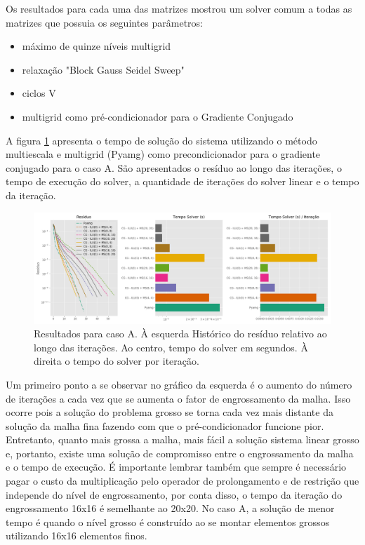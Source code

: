 Os resultados para cada uma das matrizes mostrou um solver comum a todas as matrizes que possuia os seguintes parâmetros:

\begin{itemize}
    \item máximo de quinze níveis multigrid
    \item relaxação "Block Gauss Seidel Sweep" 
    \item ciclos V
    \item multigrid como pré-condicionador para o Gradiente Conjugado
\end{itemize}

A figura \ref{fig:reservatorio100x100_1} apresenta o tempo de solução do sistema utilizando o método multiescala e multigrid (Pyamg) como precondicionador para o gradiente conjugado para o caso A. São apresentados o resíduo ao longo das iterações, o tempo de execução do solver, a quantidade de iterações do solver linear e o tempo da iteração.

\begin{figure}[!htbp]
\caption{Resultados para caso A. À esquerda Histórico do resíduo relativo ao longo das iterações. 
Ao centro, tempo do solver em segundos. À direita o tempo do solver por iteração. }
\label{fig:reservatorio100x100_1}
\centering
\includegraphics[width=\textwidth]{chap08/figs/reservatorio100x100_1.png}
\end{figure}

Um primeiro ponto a se observar no gráfico da esquerda é o aumento do número de iterações a cada vez que se aumenta o fator de engrossamento da malha. 
Isso ocorre pois a solução do problema grosso se torna cada vez mais distante da solução da malha fina fazendo com que o pré-condicionador funcione pior. 
Entretanto, quanto mais grossa a malha, mais fácil a solução sistema linear grosso e, portanto, existe uma solução de compromisso 
entre o engrossamento da malha e o tempo de execução. É importante lembrar também que sempre é necessário pagar o custo da multiplicação pelo
operador de prolongamento e de restrição que independe do nível de engrossamento, por conta disso, o tempo da iteração do engrossamento 16x16
é semelhante ao 20x20. No caso A, a solução de menor tempo é quando o nível grosso é construído ao se montar elementos grossos utilizando 16x16 elementos finos. 



